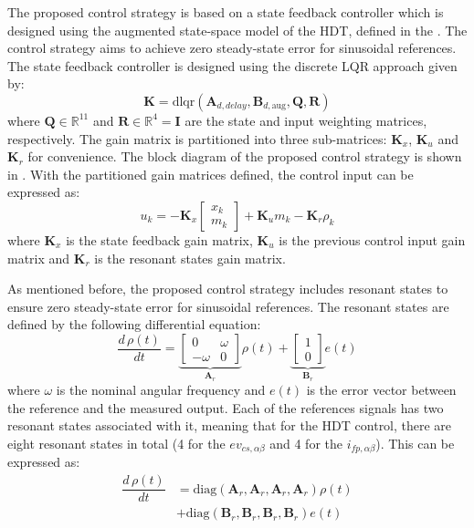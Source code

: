 The proposed control strategy is based on a state feedback controller which is designed using the augmented state-space model of the HDT, defined in the . The control strategy aims to achieve zero steady-state error for sinusoidal references. The state feedback controller is designed using the discrete LQR approach given by:
\begin{equation}
    \mathbf{K} = \text{dlqr}(\mathbf{A}_{d,delay}, \mathbf{B}_{d,\text{aug}}, \mathbf{Q}, \mathbf{R})
\end{equation}
where $\mathbf{Q}\in\mathbb{R}^{11}$ and $\mathbf{R}\in\mathbb{R}^4 = \mathbf{I}$ are the state and input weighting matrices, respectively. The gain matrix is partitioned into three sub-matrices: $\mathbf{K}_x$, $\mathbf{K}_u$ and $\mathbf{K}_r$ for convenience. The block diagram of the proposed control strategy is shown in . With the partitioned gain matrices defined, the control input can be expressed as:
\begin{equation}
    u_k = -\mathbf{K}_x
    \begin{bmatrix}
        x_k\\
        m_k
    \end{bmatrix} + \mathbf{K}_u m_k - \mathbf{K}_r \rho_k
\end{equation}
where $\mathbf{K}_x$ is the state feedback gain matrix, $\mathbf{K}_u$ is the previous control input gain matrix and $\mathbf{K}_r$ is the resonant states gain matrix.

As mentioned before, the proposed control strategy includes resonant states to ensure zero steady-state error for sinusoidal references. The resonant states are defined by the following differential equation:
\begin{equation}
    \dfrac{d\,\rho(t)}{dt} = 
    \underbrace{
    \begin{bmatrix}
        0 & \omega \\
        -\omega & 0
    \end{bmatrix}
    }_{\mathbf{A}_r}
    \rho(t) + 
    \underbrace{
    \begin{bmatrix}
        1\\
        0
    \end{bmatrix}
    }_{\mathbf{B}_r}
    e(t)
\end{equation}
where $\omega$ is the nominal angular frequency and $e(t)$ is the error vector between the reference and the measured output. Each of the references signals has two resonant states associated with it, meaning that for the HDT control, there are eight resonant states in total (4 for the $ev_{cs,\alpha\beta}$ and 4 for the $i_{fp,\alpha\beta}$). This can be expressed as:
\begin{align}
    \dfrac{d\,\rho(t)}{dt} &= \text{diag}(\mathbf{A}_r, \mathbf{A}_r, \mathbf{A}_r, \mathbf{A}_r)\rho(t)\\
    &+ \text{diag}(\mathbf{B}_r, \mathbf{B}_r, \mathbf{B}_r, \mathbf{B}_r)e(t)
\end{align}

